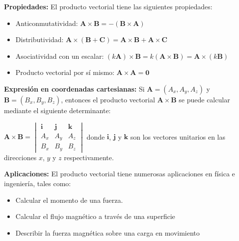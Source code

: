 \documentclass{article}
\begin{document}
\textbf{Propiedades:} El producto vectorial tiene las siguientes propiedades:
\begin{itemize}
    \item[\textbullet] Anticonmutatividad: $\mathbf{A} \times \mathbf{B} = - (\mathbf{B} \times \mathbf{A})$
    \item[\textbullet] Distributividad: $\mathbf{A} \times (\mathbf{B} + \mathbf{C}) = \mathbf{A} \times \mathbf{B} + \mathbf{A} \times \mathbf{C}$
    \item[\textbullet] Asociatividad con un escalar: $(k \mathbf{A}) \times \mathbf{B} = k (\mathbf{A} \times \mathbf{B}) = \mathbf{A} \times (k \mathbf{B})$
    \item[\textbullet] Producto vectorial por sí mismo: $\mathbf{A} \times \mathbf{A} = \mathbf{0}$
\end{itemize}


\textbf{Expresión en coordenadas cartesianas:} Si $\mathbf{A} = (A_x, A_y, A_z)$ y $\mathbf{B} = (B_x, B_y, B_z)$, entonces el producto vectorial $\mathbf{A} \times \mathbf{B}$ se puede calcular mediante el siguiente determinante:

$\mathbf{A} \times \mathbf{B} =
\begin{vmatrix}
\mathbf{i} & \mathbf{j} & \mathbf{k} \\
A_x & A_y & A_z \\
B_x & B_y & B_z
\end{vmatrix}$
donde $\mathbf{i}$, $\mathbf{j}$ y $\mathbf{k}$ son los vectores unitarios en las direcciones $x$, $y$ y $z$ respectivamente.

\textbf{Aplicaciones:} El producto vectorial tiene numerosas aplicaciones en física e ingeniería, tales como:
\begin{itemize}
    \item [\textbullet] Calcular el momento de una fuerza.
    \item[\textbullet] Calcular el flujo magnético a través de una superficie
    \item[\textbullet] Describir la fuerza magnética sobre una carga en movimiento 
\end{itemize}
\end{document}
